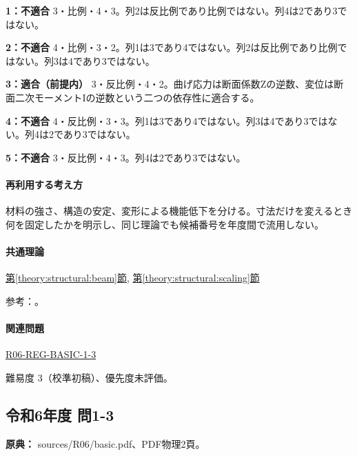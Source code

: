 \noindent\textbf{1：不適合} 3・比例・4・3。列2は反比例であり比例ではない。列4は2であり3ではない。\par

\noindent\textbf{2：不適合} 4・比例・3・2。列1は3であり4ではない。列2は反比例であり比例ではない。列3は4であり3ではない。\par

\noindent\textbf{3：適合（前提内）} 3・反比例・4・2。曲げ応力は断面係数Zの逆数、変位は断面二次モーメントIの逆数という二つの依存性に適合する。\par

\noindent\textbf{4：不適合} 4・反比例・3・3。列1は3であり4ではない。列3は4であり3ではない。列4は2であり3ではない。\par

\noindent\textbf{5：不適合} 3・反比例・4・3。列4は2であり3ではない。\par

\paragraph{再利用する考え方} 材料の強さ、構造の安定、変形による機能低下を分ける。寸法だけを変えるとき何を固定したかを明示し、同じ理論でも候補番号を年度間で流用しない。

\paragraph{共通理論} \hyperref[theory:structural:beam]{第\ref*{theory:structural:beam}節}, \hyperref[theory:structural:scaling]{第\ref*{theory:structural:scaling}節}

\par 参考：\cite{struct_mit_beam,struct_mit_buckling,struct_mlit_limit}。

\paragraph{関連問題} \hyperref[q:r06-reg-basic-1-3]{R06-REG-BASIC-1-3}

\par 難易度 3（校準初稿）、優先度未評価。

\subsection{令和6年度 問1-3}
\label{q:r06-reg-basic-1-3}

\noindent\textbf{原典：} sources/R06/basic.pdf、PDF物理2頁。

